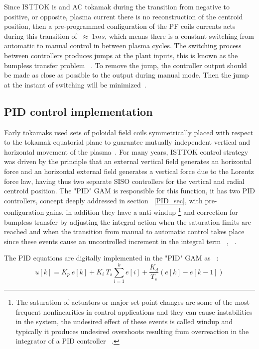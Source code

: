 Since ISTTOK is and AC tokamak during the transition from negative to positive, or opposite, plasma current there is no reconstruction of the centroid position, then a pre-programmed configuration of the  PF coils currents acts during this transition of $~\approx~1ms$, which means there is a constant switching from automatic to manual control in between plasma cycles. The switching process between controllers produces jumps at the plant inputs, this is known as the bumpless transfer problem ~\cite[Chapter~8]{Hippe2011}. To remove the jump, the controller output  should be made as close as possible to the output during manual mode. Then the jump at the instant of switching will be minimized~\cite{Vrancic1996}.   

\subsection{PID control implementation}

Early tokamaks used sets of poloidal field coils symmetrically placed with respect to the tokamak equatorial plane to guarantee mutually independent vertical and horizontal movement of the plasma~\cite[Chapter~1]{PirontiBook}. For many years, ISTTOK control strategy was driven by the principle that an external vertical field  generates an horizontal force and an horizontal external field generates a vertical force due to the Lorentz force law, having thus two separate SISO controllers for the vertical and radial centroid position. The "PID" GAM is responsible for this function, it has two PID  controllers, concept deeply addressed in section ~\ref{PID_sec},   with pre-configuration gains, in addition they have a   anti-windup \footnote{The saturation of actuators or major set point changes are some  of the most frequent nonlinearities in control applications and they can cause instabilities in the system, the undesired effect of these events is called windup and typically it produces undesired overshoots resulting from overreaction in the integrator of a PID controller ~\cite[Chapter~1]{Hippe2011}.} and correction for bumpless transfer by adjusting the integral action when the saturation limits are reached and  when the transition from manual to automatic control takes place since these events cause an uncontrolled increment in the integral term  ~\cite[Chapter~3]{Yu2011}, ~\cite{Vrancic1996}. \smallskip  

The PID equations are digitally implemented in the "PID" GAM as ~\cite[Chapter~1]{Yu2011}: 
\begin{equation}
	u[k]=K_p~e[k]+ K_i~T_s\sum_{i=1}^{k}e[i]+\frac{K_d}{T_s}(e[k]-e[k-1])
\end{equation}

